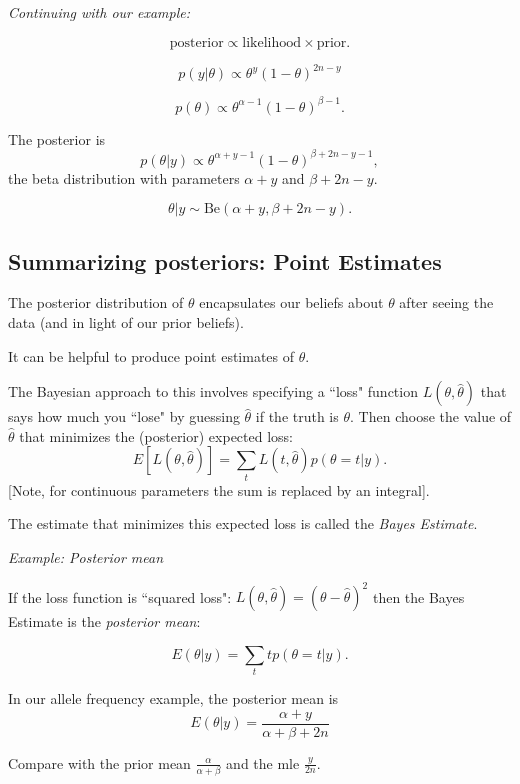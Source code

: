 {\em Continuing with our example:}

$$\mbox{posterior} \propto \mbox{likelihood} \times \mbox{prior}.$$

$$p\left( {\left. y \right|\theta }
\right) \propto \theta ^y \left( {1 - \theta } \right)^{2n - y} $$

$$p\left( \theta  \right) \propto \theta ^{\alpha  - 1} \left( {1 - \theta }
\right)^{\beta  - 1}.$$

The posterior is  
$$p\left( {\left. \theta  \right|y} \right) \propto \theta ^{\alpha  + y - 1}
\left( {1 - \theta } \right)^{\beta  + 2n - y - 1},$$
 the beta distribution with parameters $\alpha  + y$
 and $\beta  + 2n - y$.
 
 $$\theta | y \sim \text{Be}(\alpha+y, \beta + 2n -y).$$

\es\bs

 \subsection*{Summarizing posteriors: Point Estimates}

The posterior distribution of $\theta $ encapsulates our
beliefs about $\theta $ after seeing the data (and in light of our prior beliefs). 

It can be helpful to produce point estimates of $\theta$. 

The Bayesian approach to this involves specifying a ``loss" function
$L(\theta,\hat{\theta})$ that says how much you ``lose" by guessing
$\hat{\theta}$ if the truth is $\theta$. Then choose the value of $\hat{\theta}$ that
minimizes the (posterior) expected loss:
$$E[L(\theta,\hat{\theta})] = \sum_t L(t,\hat{\theta}) p(\theta= t | y).$$
[Note, for continuous parameters the sum is replaced by an integral].

The estimate that minimizes this expected loss is called the {\it Bayes Estimate}.
\es\bs

{\color{section0}\em Example: Posterior mean}

If the loss function is ``squared loss": $L(\theta,\hat{\theta}) = (\theta-\hat{\theta})^2$
then the Bayes Estimate is the {\em posterior mean}:

$$E( \theta |y ) = \sum_t t p(\theta=t  |y).$$

In our allele frequency example, the posterior mean is
$$E\left( {\left. \theta  \right|y} \right) = \frac{{\alpha  + y}}{{\alpha  + \beta  + 2n}}$$

Compare with the prior mean $\frac{\alpha }{{\alpha  + \beta }}$
 and the mle $\frac{y}{2n}.$
    \es\bs


